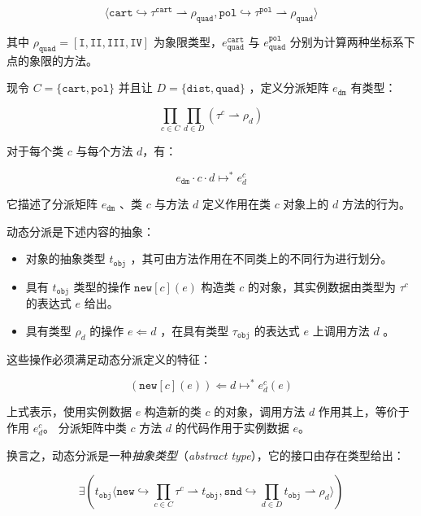 $$ \langle \mathtt{cart} \hookrightarrow \tau^{\mathtt{cart}} \rightharpoonup \rho_{\mathtt{quad}}, \mathtt{pol} \hookrightarrow \tau^{\mathtt{pol}} \rightharpoonup \rho_{\mathtt{quad}} \rangle $$

其中 $ \rho_{\mathtt{quad}} = [\mathtt{I, II, III, IV}] $ 为象限类型，$ e^{\mathtt{cart}}_{\mathtt{quad}} $ 与 $ e^{\mathtt{pol}}_{\mathtt{quad}} $ 分别为计算两种坐标系下点的象限的方法。

现令 $ C = \{ \mathtt{cart}, \mathtt{pol} \} $ 并且让 $ D = \{ \mathtt{dist}, \mathtt{quad} \} $ ，定义分派矩阵 $ e_{\mathtt{dm}} $ 有类型：

$$ \prod_{c \in C} \prod_{d \in D} (\tau^{c} \rightharpoonup \rho_{d})$$

对于每个类 $ c $ 与每个方法 $ d $，有：

$$ e_{\mathtt{dm}} \cdot c \cdot d \longmapsto^{*} e^{c}_{d} $$

它描述了分派矩阵 $ e_{\mathtt{dm}} $ 、类 $ c $ 与方法 $ d $ 定义作用在类 $ c $ 对象上的 $ d $ 方法的行为。

动态分派是下述内容的抽象：

\begin{itemize}
\item 对象的抽象类型 $ t_{\mathtt{obj}} $ ，其可由方法作用在不同类上的不同行为进行划分。
\item 具有 $t_{\mathtt{obj}}$ 类型的操作 $ \mathtt{new}[c](e) $ 构造类 $ c $ 的对象，其实例数据由类型为 $\tau^{c}$ 的表达式 $e$ 给出。
\item 具有类型 $\rho_{d}$ 的操作 $ e \Leftarrow d $ ，在具有类型 $\tau_{\mathtt{obj}}$ 的表达式 $e$ 上调用方法 $ d $ 。
\end{itemize}

这些操作必须满足动态分派定义的特征：

$$ (\mathtt{new}[c](e)) \Leftarrow d \longmapsto^{*} e^{c}_{d}(e) $$

上式表示，使用实例数据 $e$ 构造新的类 $c$ 的对象，调用方法 $d$ 作用其上，等价于作用 $e^{c}_d$。
分派矩阵中类 $c$ 方法 $d$ 的代码作用于实例数据 $e$。

换言之，动态分派是一种\textit{抽象类型}（\textit{abstract type}），它的接口由存在类型给出：

\begin{equation}\label{euqation:26.1}
\exists(t_{\mathtt{obj}}\langle \mathtt{new} \hookrightarrow \prod_{c \in C} \tau^{c} \rightharpoonup t_{\mathtt{obj}}, \mathtt{snd} \hookrightarrow \prod_{d \in D} t_{\mathtt{obj}} \rightharpoonup \rho_{d} \rangle)
\end{equation}

